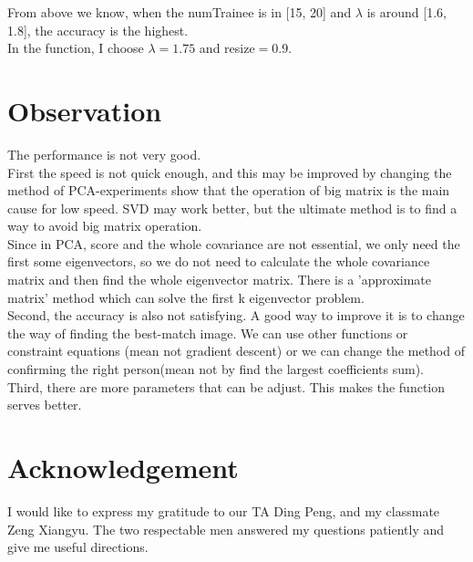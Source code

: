 \documentclass[sigconf]{acmart}
\begin{document}
From above we know, when the numTrainee is in [15, 20] and $\lambda$ is around [1.6, 1.8], the accuracy is the highest.\\

In the function, I choose $\lambda = 1.75$ and resize$ = 0.9$.


\section{Observation}



The performance is not very good.\\

First the speed is not quick enough, and this may be improved by changing the method of PCA-experiments show that the operation of big matrix is the main cause for low speed. SVD may work better, but the ultimate method is to find a way to avoid big matrix operation. \\

Since in PCA, score and the whole covariance are not essential, we only need the first some eigenvectors, so we do not need to calculate the whole covariance matrix and then find the whole eigenvector matrix. There is a 'approximate matrix' method which can solve the first k eigenvector problem.\\

Second, the accuracy is also not satisfying. A good way to improve it is to change the way of finding the best-match image. We can use other functions or constraint equations (mean not gradient descent) or we can change the method of confirming the right person(mean not by find the largest coefficients sum).\\

Third, there are more parameters that can be adjust. This makes the function serves better.
\section{Acknowledgement}

I would like to express my gratitude to our TA Ding Peng, and my classmate Zeng Xiangyu. The two respectable men answered my questions patiently and give me useful directions.\\


 
\end{document}

